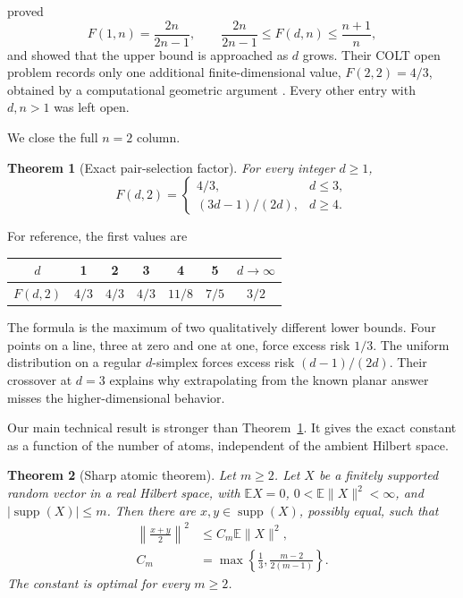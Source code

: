\documentclass[twoside]{article}
\newtheorem{theorem}{Theorem}
\newcommand{\E}{\mathbb E}
\newcommand{\supp}{\operatorname{supp}}
\begin{document}
\citet{hanneke2025selection} proved \[ F(1,n)=\frac{2n}{2n-1}, \qquad \frac{2n}{2n-1}\leq F(d,n)\leq\frac{n+1}{n}, \] and showed that the upper bound is approached as $d$ grows. Their COLT open problem records only one additional finite-dimensional value, $F(2,2)=4/3$, obtained by a computational geometric argument \citep{hanneke2025open}. Every other entry with $d,n>1$ was left open.

We close the full $n=2$ column.

\begin{theorem}[Exact pair-selection factor]\label{thm:main}
For every integer $d\geq1$,
\begin{equation}\label{eq:main}
 F(d,2)=\begin{cases}
 4/3,&d\leq3,\\
 (3d-1)/(2d),&d\geq4.
 \end{cases}
\end{equation}
\end{theorem}

For reference, the first values are
\begin{center}
\begin{tabular}{c@{\quad}ccccc@{\quad}c}
\toprule
$d$ & 1 & 2 & 3 & 4 & 5 & $d\to\infty$\\
\midrule
$F(d,2)$ & $4/3$ & $4/3$ & $4/3$ & $11/8$ & $7/5$ & $3/2$\\
\bottomrule
\end{tabular}
\end{center}

The formula is the maximum of two qualitatively different lower bounds. Four points on a line, three at zero and one at one, force excess risk $1/3$. The uniform distribution on a regular $d$-simplex forces excess risk $(d-1)/(2d)$. Their crossover at $d=3$ explains why extrapolating from the known planar answer misses the higher-dimensional behavior.

Our main technical result is stronger than Theorem~\ref{thm:main}. It gives the exact constant as a function of the number of atoms, independent of the ambient Hilbert space.

\begin{theorem}[Sharp atomic theorem]\label{thm:atomic}
Let $m\geq2$. Let $X$ be a finitely supported random vector in a real Hilbert space, with $\E X=0$, $0<\E\|X\|^2<\infty$, and $|\supp(X)|\leq m$. Then there are $x,y\in\supp(X)$, possibly equal, such that
\begin{align}\label{eq:atomic}
 \left\|\frac{x+y}{2}\right\|^2
 &\leq C_m\E\|X\|^2,\\
 C_m&=\max\left\{\frac13,\frac{m-2}{2(m-1)}\right\}.
\end{align}
The constant is optimal for every $m\geq2$.
\end{theorem}
\end{document}
